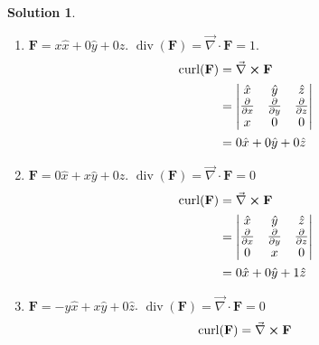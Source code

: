 \documentclass[10pt]{article}
\theoremstyle{definition}
\newtheorem{soln}{Solution}
\newcommand{\ux}{\hat{x}}
\newcommand{\uy}{\hat{y}}
\newcommand{\uz}{\hat{z}}
\DeclareMathOperator{\Div}{div}
\DeclareMathOperator{\Curl}{curl}
\begin{document}
\begin{soln}
  \begin{enumerate}[label=(\alph*)]
    \item $\mathbf{F}=x\ux+0\uy+0\uz$.
          $\Div(\mathbf{F})=\vec{\nabla} \cdot \mathbf{F}=1$.
          \begin{align*}
            \Curl(\mathbf{F}) & =\vec{\nabla} \cross \mathbf{F}                                                          \\
                              & =\begin{vmatrix}
                                   \ux                         & \uy                         & \uz                         \\
                                   \frac{\partial}{\partial x} & \frac{\partial}{\partial y} & \frac{\partial}{\partial z} \\
                                   x                           & 0                           & 0
                                 \end{vmatrix} \\
                              & = 0\ux + 0\uy+0\uz
          \end{align*}
    \item $\mathbf{F}=0\ux+x\uy+0\uz$. $\Div(\mathbf{F})=\vec{\nabla} \cdot \mathbf{F}=0$
          \begin{align*}
            \Curl(\mathbf{F}) & =\vec{\nabla} \cross \mathbf{F}                                                          \\
                              & =\begin{vmatrix}
                                   \ux                         & \uy                         & \uz                         \\
                                   \frac{\partial}{\partial x} & \frac{\partial}{\partial y} & \frac{\partial}{\partial z} \\
                                   0                           & x                           & 0
                                 \end{vmatrix} \\
                              & = 0\ux + 0\uy+ 1\uz
          \end{align*}
    \item $\mathbf{F}=-y\ux+x\uy+0\uz$. $\Div(\mathbf{F})=\vec{\nabla} \cdot \mathbf{F}=0$
          \begin{align*}
            \Curl(\mathbf{F}) & =\vec{\nabla} \cross \mathbf{F}                                                          \\

\end{align*}
\end{enumerate}
\end{soln}
\end{document}
